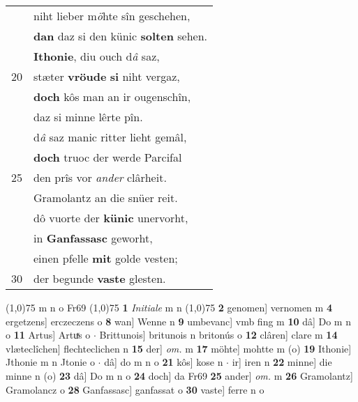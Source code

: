 \documentclass[8pt,a4paper,notitlepage]{article}
\begin{document}
\begin{table}[ht]
\begin{minipage}[t]{0.5\linewidth}
\begin{tabular}{rl}
 & niht lieber m\textit{ö}hte sîn geschehen,\\ 
 & \textbf{dan} daz si den künic \textbf{solten} sehen.\\ 
 & \textbf{Ithonie}, diu ouch d\textit{â} saz,\\ 
20 & stæter \textbf{vröude} \textbf{si} niht vergaz,\\ 
 & \textbf{doch} kôs man an ir ougenschîn,\\ 
 & daz si minne lêrte pîn.\\ 
 & d\textit{â} saz manic ritter lieht gemâl,\\ 
 & \textbf{doch} truoc der werde Parcifal\\ 
25 & den prîs vor \textit{ander} clârheit.\\ 
 & Gramolantz an die snüer reit.\\ 
 & dô vuorte der \textbf{künic} unervorht,\\ 
 & in \textbf{Ganfassasc} geworht,\\ 
 & einen pfelle \textbf{mit} golde vesten;\\ 
30 & der begunde \textbf{vaste} glesten.\\ 
\end{tabular}
\scriptsize
\line(1,0){75} \newline
m n o Fr69 \newline
\line(1,0){75} \newline
\textbf{1} \textit{Initiale} m n  \newline
\line(1,0){75} \newline
\textbf{2} genomen] vernomen m \textbf{4} ergetzens] erczeczens o \textbf{8} wan] Wenne n \textbf{9} umbevanc] vmb fing m \textbf{10} dâ] Do m n o \textbf{11} Artus] Artuͯs o  $\cdot$ Brittunois] britunois n britonús o \textbf{12} clâren] clare m \textbf{14} vlæteclîchen] flechteclichen n \textbf{15} der] \textit{om.} m \textbf{17} möhte] mohtte m (o) \textbf{19} Ithonie] Jthonie m n Jtonie o  $\cdot$ dâ] do m n o \textbf{21} kôs] kose n  $\cdot$ ir] iren n \textbf{22} minne] die minne n (o) \textbf{23} dâ] Do m n o \textbf{24} doch] da Fr69 \textbf{25} ander] \textit{om.} m \textbf{26} Gramolantz] Gramolancz o \textbf{28} Ganfassasc] ganfassat o \textbf{30} vaste] ferre n o \newline
\end{minipage}
\end{table}
\newpage
\end{document}
